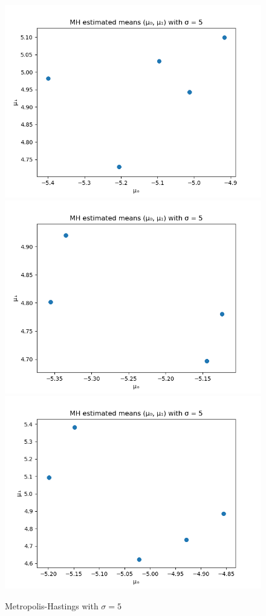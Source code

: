 \begin{figure}
	\includegraphics[scale=0.5]{mh-estimated-means-with-sigma-5-4.png}
	\includegraphics[scale=0.5]{mh-estimated-means-with-sigma-5-5.png}
	\includegraphics[scale=0.5]{mh-estimated-means-with-sigma-5-6.png}
	\caption{Metropolis-Hastings with $\sigma = 5$}
	\label{mh-figure-5}
\end{figure}

